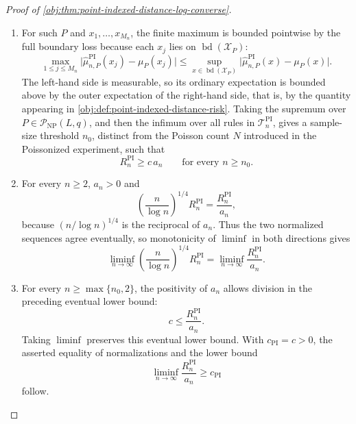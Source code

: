 \documentclass[11pt]{article}
\begin{document}
\begin{proof}[Proof of \cref{obj:thm:point-indexed-distance-log-converse}]
\begin{enumerate}
\item
For such \(P\) and \(x_1,\ldots,x_{M_n}\), the finite maximum is bounded pointwise by the full boundary loss because each \(x_j\) lies on \(\operatorname{bd}(\mathcal X_P)\):
\[
\max_{1\le j\le M_n}\bigl|\widehat\mu^{\mathrm{PI}}_{n,P}(x_j)-\mu_P(x_j)\bigr|
\le
\sup_{x\in\operatorname{bd}(\mathcal X_P)}\bigl|\widehat\mu^{\mathrm{PI}}_{n,P}(x)-\mu_P(x)\bigr| .
\]
The left-hand side is measurable, so its ordinary expectation is bounded above by the outer expectation of the right-hand side, that is, by the quantity appearing in \cref{obj:def:point-indexed-distance-risk}.  Taking the supremum over \(P\in\mathcal P_{\mathrm{NP}}(L,q)\), and then the infimum over all rules in \(\mathcal T_n^{\mathrm{PI}}\), gives a sample-size threshold \(n_0\), distinct from the Poisson count \(N\) introduced in the Poissonized experiment, such that
\[
R_n^{\mathrm{PI}}\geq c\,a_n
\qquad\text{for every } n\geq n_0 .
\]

\item
For every \(n\geq2\), \(a_n>0\) and
\[
\left(\frac{n}{\log n}\right)^{1/4}R_n^{\mathrm{PI}}
=
\frac{R_n^{\mathrm{PI}}}{a_n},
\]
because \((n/\log n)^{1/4}\) is the reciprocal of \(a_n\).  Thus the two normalized sequences agree eventually, so monotonicity of \(\liminf\) in both directions gives
\[
\liminf_{n\to\infty}
\left(\frac{n}{\log n}\right)^{1/4}R_n^{\mathrm{PI}}
=
\liminf_{n\to\infty}\frac{R_n^{\mathrm{PI}}}{a_n}.
\]

\item
For every \(n\geq \max\{n_0,2\}\), the positivity of \(a_n\) allows division in the preceding eventual lower bound:
\[
c\leq \frac{R_n^{\mathrm{PI}}}{a_n}.
\]
Taking \(\liminf\) preserves this eventual lower bound.  With \(c_{\mathrm{PI}}=c>0\), the asserted equality of normalizations and the lower bound
\[
\liminf_{n\to\infty}\frac{R_n^{\mathrm{PI}}}{a_n}\geq c_{\mathrm{PI}}
\]
follow.
\end{enumerate}
\end{proof}
\end{document}
